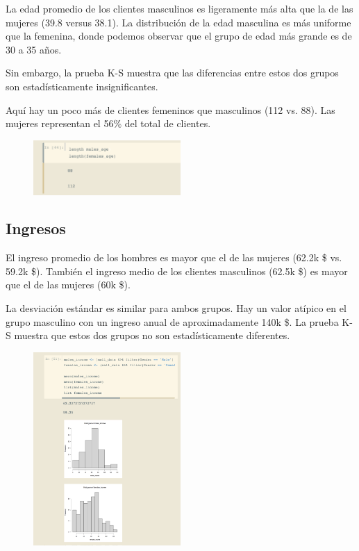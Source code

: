 \documentclass[12pt, fleqn]{report}                             %
\theoremstyle{break}                                            %
\begin{document}
                La edad promedio de los clientes masculinos es ligeramente más
                alta que la de las mujeres (39.8 versus 38.1). La distribución de 
                la edad masculina es más uniforme que la femenina, donde podemos
                observar que el grupo de edad más grande es de 30 a 35 años. 
                
                Sin embargo, la prueba K-S muestra que las diferencias entre estos 
                dos grupos son estadísticamente insignificantes.

                Aquí hay un poco más de clientes femeninos que masculinos (112 vs. 88). 
                Las mujeres representan el 56\% del total de clientes.

                \begin{figure}[ht!]
                    \centering
                    \includegraphics[width=0.5\textwidth]{6}
                \end{figure}

            \clearpage
            \subsection{Ingresos}

                El ingreso promedio de los hombres es mayor que el de las mujeres (62.2k \$ vs. 59.2k \$). 
                También el ingreso medio de los clientes masculinos (62.5k \$) es mayor que el de las mujeres (60k \$). 
                
                La desviación estándar es similar para ambos grupos. Hay un valor atípico en el grupo masculino con un ingreso anual
                de aproximadamente 140k \$. La prueba K-S muestra que estos dos grupos no son estadísticamente diferentes.

                \begin{figure}[ht!]
                    \centering
                    \includegraphics[width=0.5\textwidth]{7}
                \end{figure}
\end{document}
